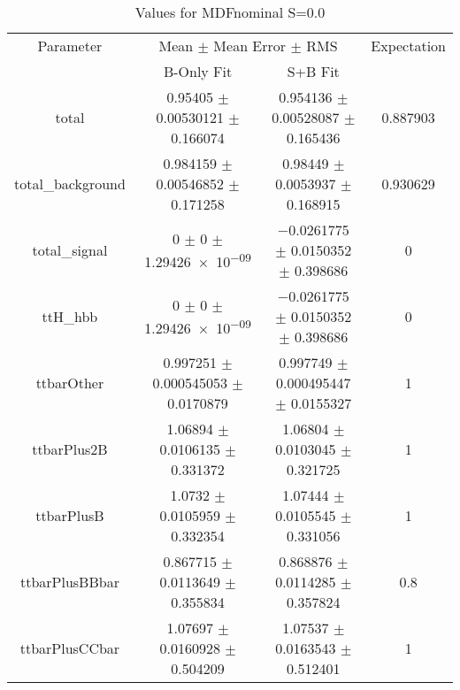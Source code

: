 \begin{table}
\centering
\caption{Values for MDFnominal S=0.0}
\begin{tabular}{cccc}
\toprule
Parameter & \multicolumn{2}{c}{Mean $\pm$ Mean Error $\pm$ RMS} & Expectation\\
 & B-Only Fit & S+B Fit & \\
\midrule
total & \num{0.95405} $\pm$ \num{0.00530121} $\pm$ \num{0.166074} & \num{0.954136} $\pm$ \num{0.00528087} $\pm$ \num{0.165436} & \num{0.887903}\\
total\_background & \num{0.984159} $\pm$ \num{0.00546852} $\pm$ \num{0.171258} & \num{0.98449} $\pm$ \num{0.0053937} $\pm$ \num{0.168915} & \num{0.930629}\\
total\_signal & \num{0} $\pm$ \num{0} $\pm$ \num{1.29426e-09} & \num{-0.0261775} $\pm$ \num{0.0150352} $\pm$ \num{0.398686} & \num{0}\\
ttH\_hbb & \num{0} $\pm$ \num{0} $\pm$ \num{1.29426e-09} & \num{-0.0261775} $\pm$ \num{0.0150352} $\pm$ \num{0.398686} & \num{0}\\
ttbarOther & \num{0.997251} $\pm$ \num{0.000545053} $\pm$ \num{0.0170879} & \num{0.997749} $\pm$ \num{0.000495447} $\pm$ \num{0.0155327} & \num{1}\\
ttbarPlus2B & \num{1.06894} $\pm$ \num{0.0106135} $\pm$ \num{0.331372} & \num{1.06804} $\pm$ \num{0.0103045} $\pm$ \num{0.321725} & \num{1}\\
ttbarPlusB & \num{1.0732} $\pm$ \num{0.0105959} $\pm$ \num{0.332354} & \num{1.07444} $\pm$ \num{0.0105545} $\pm$ \num{0.331056} & \num{1}\\
ttbarPlusBBbar & \num{0.867715} $\pm$ \num{0.0113649} $\pm$ \num{0.355834} & \num{0.868876} $\pm$ \num{0.0114285} $\pm$ \num{0.357824} & \num{0.8}\\
ttbarPlusCCbar & \num{1.07697} $\pm$ \num{0.0160928} $\pm$ \num{0.504209} & \num{1.07537} $\pm$ \num{0.0163543} $\pm$ \num{0.512401} & \num{1}\\
\bottomrule
\end{tabular}
\end{table}